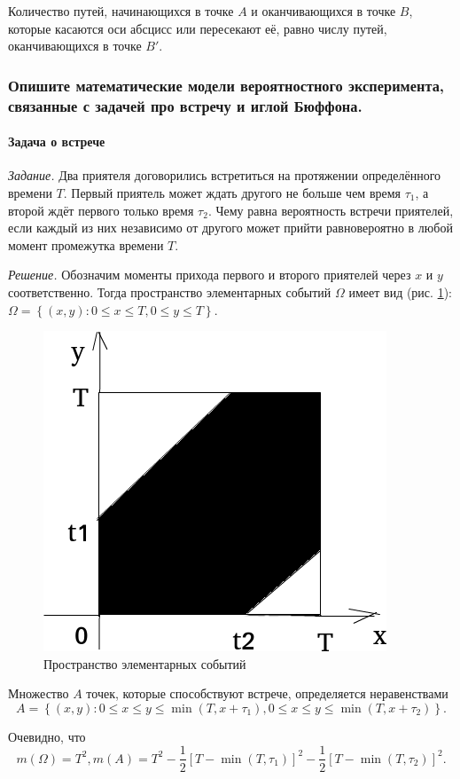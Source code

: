 Количество путей, начинающихся в точке $A$ и оканчивающихся в точке $B$, которые касаются оси абсцисс или пересекают её, равно числу путей, оканчивающихся в точке $B'$.

\subsubsection*{Опишите математические модели вероятностного эксперимента, связанные с задачей про встречу и иглой Бюффона.}

\paragraph*{Задача о встрече}

\textit{Задание.} Два приятеля договорились встретиться на протяжении определённого времени $T$.
Первый приятель может ждать другого не больше чем время $ \tau_1$, а второй ждёт первого только время $ \tau_2$.
Чему равна вероятность встречи приятелей, если каждый из них независимо от другого может прийти равновероятно в любой момент промежутка времени $T$.

\textit{Решение.} Обозначим моменты прихода первого и второго приятелей через $x$ и $y$ соответственно.
Тогда пространство элементарных событий $ \Omega $ имеет вид (рис. \ref{fig:41}): $ \Omega = \left\{ \left( x, y \right): 0 \leq  x \leq T, 0 \leq y \leq T \right\} $.

\begin{figure}[h!]
  \centering
  \includegraphics[width=.4\textwidth]{./pictures/4_1.png}
  \caption{Пространство элементарных событий}
  \label{fig:41}
\end{figure}

Множество $A$ точек, которые способствуют встрече, определяется неравенствами
$$A =
\left\{ \left( x, y \right):
0 \leq x \leq y \leq \min \left( T, x + \tau_1 \right),
0 \leq x \leq y \leq \min \left( T, x + \tau_2 \right) \right\}.$$

Очевидно, что
$$m \left( \Omega \right) =
T^2,
m \left( A \right) =
T^2 - \frac{1}{2} \left[ T - \min \left( T, \tau_1 \right) \right]^2 - \frac{1}{2} \left[ T - \min \left( T, \tau_2 \right) \right]^2.$$

